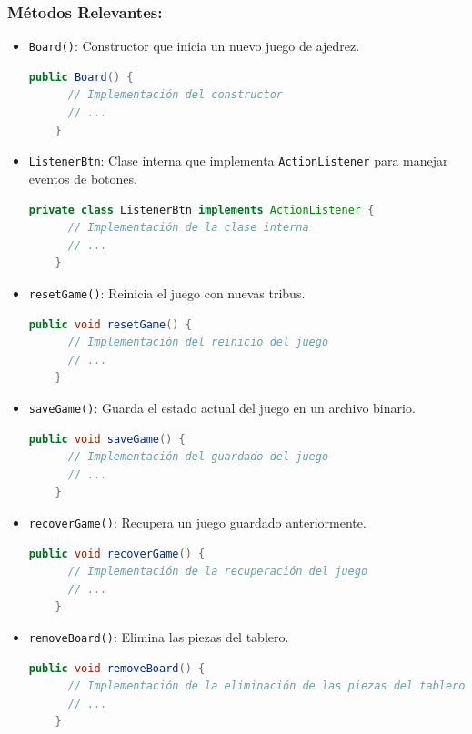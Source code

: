 \documentclass{article}
\begin{document}
\subsubsection{Métodos Relevantes:}
\begin{itemize}
  \item \texttt{Board()}: Constructor que inicia un nuevo juego de ajedrez.
  \begin{lstlisting}[language=java,caption={Constructor \texttt{Board} en la clase \texttt{Board}}]
    public Board() {
      // Implementación del constructor
      // ...
    }
  \end{lstlisting}

  \item \texttt{ListenerBtn}: Clase interna que implementa \texttt{ActionListener} para manejar eventos de botones.
  \begin{lstlisting}[language=java,caption={Clase interna \texttt{ListenerBtn} en la clase \texttt{Board}}]
    private class ListenerBtn implements ActionListener {
      // Implementación de la clase interna
      // ...
    }
  \end{lstlisting}

  \item \texttt{resetGame()}: Reinicia el juego con nuevas tribus.
  \begin{lstlisting}[language=java,caption={Método \texttt{resetGame} en la clase \texttt{Board}}]
    public void resetGame() {
      // Implementación del reinicio del juego
      // ...
    }
  \end{lstlisting}

  \item \texttt{saveGame()}: Guarda el estado actual del juego en un archivo binario.
  \begin{lstlisting}[language=java,caption={Método \texttt{saveGame} en la clase \texttt{Board}}]
    public void saveGame() {
      // Implementación del guardado del juego
      // ...
    }
  \end{lstlisting}

  \item \texttt{recoverGame()}: Recupera un juego guardado anteriormente.
  \begin{lstlisting}[language=java,caption={Método \texttt{recoverGame} en la clase \texttt{Board}}]
    public void recoverGame() {
      // Implementación de la recuperación del juego
      // ...
    }
  \end{lstlisting}

  \item \texttt{removeBoard()}: Elimina las piezas del tablero.
  \begin{lstlisting}[language=java,caption={Método \texttt{removeBoard} en la clase \texttt{Board}}]
    public void removeBoard() {
      // Implementación de la eliminación de las piezas del tablero
      // ...
    }
  \end{lstlisting}


\end{itemize}
\end{document}
